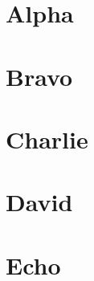 \documentclass[letterpaper]{latexclasses/tmarticle}
\begin{document}
\maketitle


\newpage
\tableofcontents

\newpage

\section{Alpha}

\lipsum[1]

\section{Bravo}

\lipsum[2-3]

\section{Charlie}

\lipsum[4-5]

\section{David}

\lipsum[6-8]

\section{Echo}

\lipsum[9]
\end{document}
